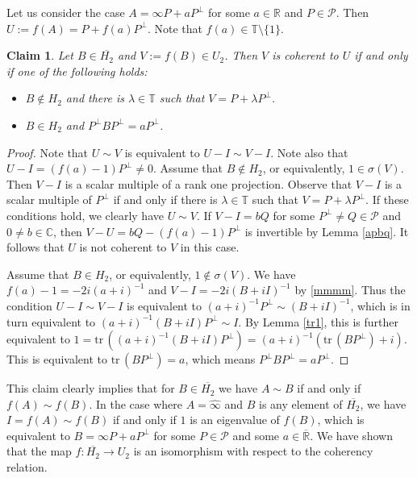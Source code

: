 \documentclass[10pt,a4paper]{amsart}
\newcommand\cP{{\mathcal{P}}}
\newcommand\bR{{\mathbb{R}}}
\newcommand\oH{{\overline{H_2}}}
\newcommand\oi{{\widehat{\infty}}}
\newcommand\oR{{\overline{\mathbb{R}}}}
\newtheorem{claim}[theorem]{Claim}
\theoremstyle{definition}
\theoremstyle{remark}
\numberwithin{subsection}{section}
\numberwithin{equation}{section}
\begin{document}
Let us consider the case $A= \infty P+a P^{\perp}$ for some $a \in \bR$ and $P \in \cP$. 
Then $U:=f(A) = P+f(a)P^\perp$. Note that $f(a)\in \mathbb{T}\setminus\{1\}$.
\begin{claim}\label{uv}
Let $B\in \oH$ and $V:=f(B)\in U_2$. 
Then $V$ is coherent to $U$ if and only if one of the following holds: 
\begin{itemize}
\item $B\notin H_2$ and there is $\lambda\in \mathbb{T}$ such that $V=P+\lambda P^\perp$. 
\item $B\in H_2$ and $P^\perp BP^\perp = aP^\perp$. 
\end{itemize}
\end{claim}
\begin{proof}
Note that  $U\sim V$ is equivalent to $U-I\sim V-I$. Note also that $U-I= (f(a)-1)P^\perp\neq 0$. 
Assume that $B\notin H_2$, or equivalently, $1\in \sigma(V)$. 
Then $V-I$ is a scalar multiple of a rank one projection.   
Observe that $V-I$ is a scalar multiple of $P^\perp$ if and only if there is $\lambda\in \mathbb{T}$ such that $V=P+\lambda P^\perp$. 
If these conditions hold, we clearly have $U\sim V$. 
If $V-I=bQ$ for some $P^\perp\neq Q\in \mathcal{P}$ and $0\neq b\in \mathbb{C}$, then $V-U=bQ- (f(a)-1)P^\perp$ is invertible by Lemma \ref{apbq}. 
It follows that $U$ is not coherent to $V$ in this case. 

Assume that $B\in H_2$, or equivalently, $1\notin \sigma(V)$. 
We have $f(a)-1=-2i(a+i)^{-1}$ and $V-I= -2i(B+iI)^{-1}$ by \eqref{mmmm}.
Thus the condition $U-I\sim V-I$ is equivalent to $(a+i)^{-1}P^\perp\sim (B+iI)^{-1}$, which is in turn equivalent to $(a+i)^{-1}(B+iI)P^\perp \sim I$.
By Lemma \ref{tr1}, this is further equivalent to $1=\mathrm{tr}\, ((a+i)^{-1}(B+iI)P^\perp) = (a+i)^{-1}(\mathrm{tr}\,(BP^\perp) +i)$. 
This is equivalent to $\mathrm{tr}\,(BP^\perp) =a$, which means $P^\perp BP^\perp =aP^\perp$.
\end{proof}

This claim clearly implies that for $B\in \oH$ we have $A\sim B$ if and only if $f(A)\sim f(B)$. 
In the case where $A = {\oi}$ and $B$ is any element of $\oH$, we have $I = f(A) \sim f(B)$ if and only if $1$ is an eigenvalue of $f(B)$, which is equivalent to $B= \infty P+aP^{\perp}$ for some $P\in \cP$ and some $a \in {\oR}$.
We have shown that the map $f\colon \oH \to U_2$ is an isomorphism with respect to the coherency relation. 
\end{document}
